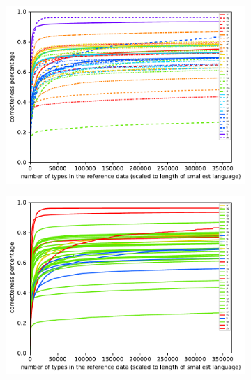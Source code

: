 \documentclass[11pt,a4paper,twoside,openright]{scrbook}
\begin{document}
\begin{figure}[h]
    \centering
    \begin{subfigure}[b]{0.32\textwidth}
    	\centering
        \includegraphics[width=\textwidth]{graphs/lstm/norm_huge_type_token_performance}
    \end{subfigure}
    \begin{subfigure}[b]{0.32\textwidth}
    	\centering
        \includegraphics[width=\textwidth]{graphs/lstm/morph_types/norm_huge_type_token_performance}
    \end{subfigure}
    \begin{subfigure}[b]{0.32\textwidth}
    	\centering

\end{subfigure}
\end{figure}
\end{document}
